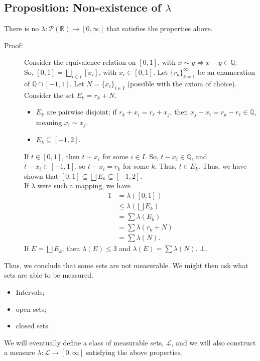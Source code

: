 \documentclass[9pt]{extarticle}
\newcommand{\Q}{\mathbb{Q}}
\newcommand{\R}{\mathbb{R}}
\begin{document}
  \subsection{Proposition: Non-existence of $\lambda$}%
  There is no $\lambda: \mathcal{P}(\R)\rightarrow [0,\infty]$ that satisfies the properties above.
  \begin{description}
    \item[Proof:] Consider the equivalence relation on $[0,1]$, with $x\sim y \Leftrightarrow x-y\in \Q$.\\

      So, $[0,1] = \bigsqcup_{i\in I} [x_i]$, with $x_i\in [0,1]$. Let $\{r_k\}_{k=1}^{\infty}$ be an enumeration of $\Q \cap [-1,1]$. Let $N = \{x_i\}_{i\in I}$ (possible with the axiom of choice).\\

      Consider the set $E_k = r_k + N$.
      \begin{itemize}
        \item $E_k$ are pairwise disjoint; if $r_k + x_i = r_{\ell} + x_j$, then $x_j - x_i = r_k - r_{\ell}\in \Q$, meaning $x_i \sim x_j$.
        \item $E_k \subseteq [-1,2]$.
      \end{itemize}
      If $t\in [0,1]$, then $t\sim x_i$ for some $i\in I$. So, $t-x_i \in \Q$, and $t-x_i\in [-1,1]$, so $t-x_i = r_k$ for some $k$. Thus, $t\in E_k$. Thus, we have shown that $[0,1]\subseteq \bigsqcup E_k\subseteq [-1,2]$.\\

      If $\lambda$ were such a mapping, we have
      \begin{align*}
        1 &= \lambda([0,1])\\
          &\leq \lambda(\bigsqcup E_k)\\
          &= \sum \lambda(E_k)\\
          &= \sum \lambda(r_k + N)\\
          &= \sum \lambda(N).
      \end{align*}
      If $E = \bigsqcup E_k$, then $\lambda(E) \leq 3$ and $\lambda(E) = \sum \lambda(N)$. $\bot$.
  \end{description}
  Thus, we conclude that some sets are not measurable. We might then ask what sets are able to be measured.
  \begin{itemize}
    \item Intervals;
    \item open sets;
    \item closed sets.
  \end{itemize}
  We will eventually define a class of measurable sets, $\mathcal{L}$, and we will also construct a measure $\lambda: \mathcal{L}\rightarrow [0,\infty]$ satisfying the above properties.
\end{document}
